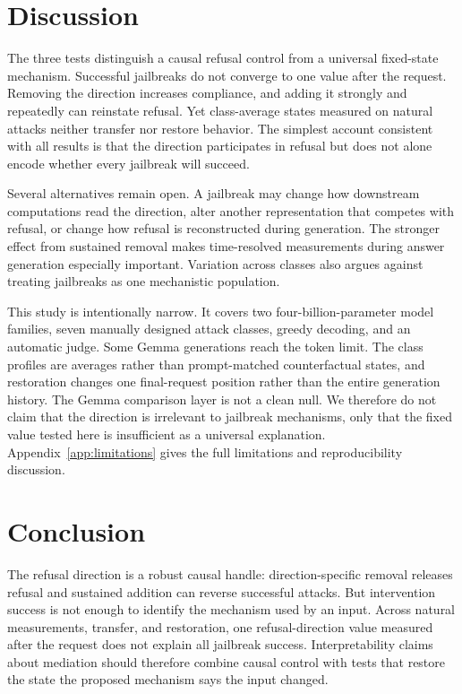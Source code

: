 \documentclass{article}
\begin{document}
\section{Discussion}

The three tests distinguish a causal refusal control from a universal fixed-state mechanism. Successful jailbreaks do not converge to one value after the request. Removing the direction increases compliance, and adding it strongly and repeatedly can reinstate refusal. Yet class-average states measured on natural attacks neither transfer nor restore behavior. The simplest account consistent with all results is that the direction participates in refusal but does not alone encode whether every jailbreak will succeed.

Several alternatives remain open. A jailbreak may change how downstream computations read the direction, alter another representation that competes with refusal, or change how refusal is reconstructed during generation. The stronger effect from sustained removal makes time-resolved measurements during answer generation especially important. Variation across classes also argues against treating jailbreaks as one mechanistic population.

This study is intentionally narrow. It covers two four-billion-parameter model families, seven manually designed attack classes, greedy decoding, and an automatic judge. Some Gemma generations reach the token limit. The class profiles are averages rather than prompt-matched counterfactual states, and restoration changes one final-request position rather than the entire generation history. The Gemma comparison layer is not a clean null. We therefore do not claim that the direction is irrelevant to jailbreak mechanisms, only that the fixed value tested here is insufficient as a universal explanation. Appendix~\ref{app:limitations} gives the full limitations and reproducibility discussion.

\section{Conclusion}

The refusal direction is a robust causal handle: direction-specific removal releases refusal and sustained addition can reverse successful attacks. But intervention success is not enough to identify the mechanism used by an input. Across natural measurements, transfer, and restoration, one refusal-direction value measured after the request does not explain all jailbreak success. Interpretability claims about mediation should therefore combine causal control with tests that restore the state the proposed mechanism says the input changed.
\end{document}
